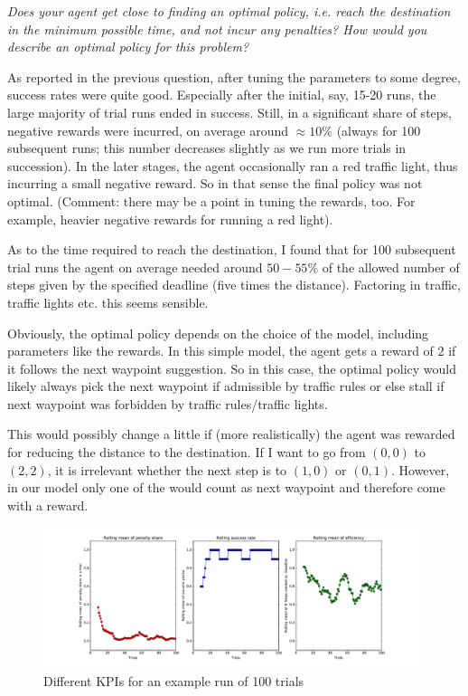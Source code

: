 \documentclass[a4paper,11pt]{article}
\numberwithin{equation}{section}
\numberwithin{figure}{section}
\begin{document}
\textit{Does your agent get close to finding an optimal policy, i.e. reach the destination in the minimum possible time, and not incur any penalties? How would you describe an optimal policy for this problem?}

As reported in the previous question, after tuning the parameters to some degree, success rates were quite good. Especially after the initial, say, 15-20 runs, the large majority of trial runs ended in success. Still, in a significant share of steps, negative rewards were incurred, on average around $\approx 10\%$ (always for 100 subsequent runs; this number decreases slightly as we run more trials in succession). In the later stages, the agent occasionally ran a red traffic light, thus incurring a small negative reward. So in that sense the final policy was not optimal. (Comment: there may be a point in tuning the rewards, too. For example, heavier negative rewards for running a red light).

As to the time required to reach the destination, I found that for 100 subsequent trial runs the agent on average needed around $50-55\%$ of the allowed number of steps given by the specified deadline (five times the distance). Factoring in traffic, traffic lights etc. this seems sensible. 

Obviously, the optimal policy depends on the choice of the model, including parameters like the rewards. In this simple model, the agent gets a reward of $2$ if it follows the next waypoint suggestion. So in this case, the optimal policy would likely always pick the next waypoint if admissible by traffic rules or else stall if next waypoint was forbidden by traffic rules/traffic lights.

This would possibly change a little if (more realistically) the agent was rewarded for reducing the distance to the destination. If I want to go from $(0,0)$ to $(2,2)$, it is irrelevant whether the next step is to $(1,0)$ or $(0,1)$. However, in our model only one of the would count as next waypoint and therefore come with a reward. 

\begin{figure}
\includegraphics[width=0.98\textwidth]{charts}
\caption{Different KPIs for an example run of 100 trials}
\end{figure}
\end{document}
